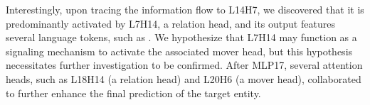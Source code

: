 Interestingly, upon tracing the information flow to L14H7, we discovered that it is predominantly activated by L7H14, a relation head, and its output features several language tokens, such as .
We hypothesize that L7H14 may function as a signaling mechanism to activate the associated mover head, but this hypothesis necessitates further investigation to be confirmed. 
After MLP17, several attention heads, such as L18H14 (a relation head) and L20H6 (a mover head), collaborated to further enhance the final prediction of the target entity.
